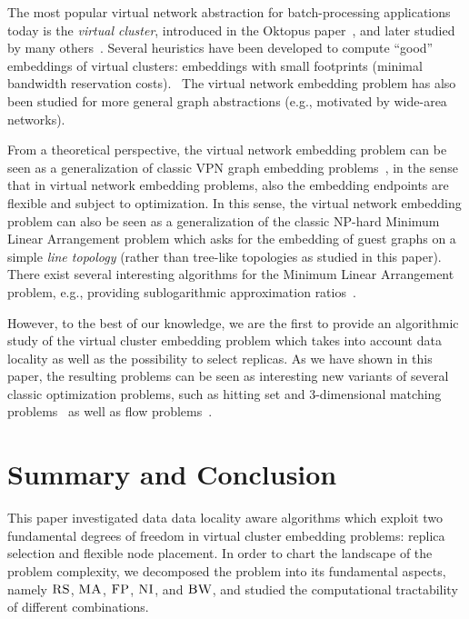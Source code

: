 \documentclass[9pt,twocolumn]{scrartcl}
\newcommand{\CC}{\textsc{NI}}
\newcommand{\FP}{\textsc{FP}}
\newcommand{\RS}{\textsc{RS}}
\newcommand{\BW}{\textsc{BW}}
\newcommand{\MA}{\textsc{MA}}
\begin{document}
The most popular virtual network abstraction for batch-processing applications today is the \emph{virtual cluster},
introduced in the Oktopus paper~\cite{oktopus}, and later studied by many others~\cite{talk-about,proteus}.
Several heuristics have been developed to compute ``good'' embeddings of virtual clusters: embeddings
with small footprints (minimal bandwidth reservation costs).~\cite{oktopus,talk-about,proteus}
The virtual network embedding problem has also been studied for more general graph abstractions
(e.g., motivated by wide-area networks).~\cite{infocom2009,ammar,turner,simannealing,ucc12mip,zhu06}

From a theoretical perspective, the virtual network embedding problem can be seen as a generalization
of classic VPN graph embedding problems~\cite{Goyal2008,gupta2001provisioning},
in the sense that in virtual network embedding problems, also the embedding endpoints are flexible and subject to optimization.
In this sense, the virtual network embedding problem can also be seen as a generalization of the
classic NP-hard Minimum Linear Arrangement problem which asks for the
embedding of guest graphs on a simple \emph{line topology} (rather than tree-like topologies as
studied in this paper).~\cite{mla,mla-survey}
There exist several interesting algorithms for the Minimum Linear Arrangement problem,
e.g., providing sublogarithmic approximation ratios~\cite{mla-feige}.

However, to the best of our knowledge, we are the first to provide an algorithmic
study of the virtual cluster embedding problem which takes into account
data locality as well as the possibility to select replicas. As we have shown in this paper,
the resulting problems can be seen as interesting new variants of several classic optimization
problems, such as hitting set and 3-dimensional matching problems~\cite{3SC-hard} as well as flow problems~\cite{korte2002combinatorial}.

\section{Summary and Conclusion}\label{sec:conclusion}

This paper investigated data data locality aware algorithms which exploit two fundamental
degrees of freedom in virtual cluster
embedding problems: replica selection and flexible node placement. In order to
chart the landscape of the problem complexity, we
decomposed the problem into its fundamental aspects,
namely $\RS$, $\MA$, $\FP$, $\CC$, and $\BW$, and studied the computational
tractability of different combinations.
\end{document}
